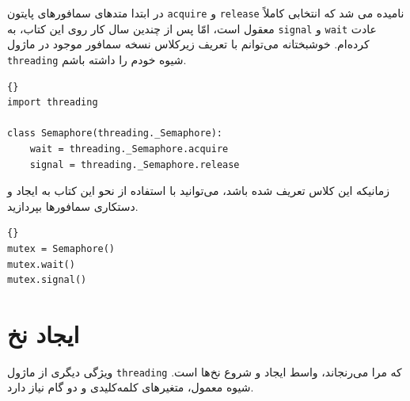 \documentclass{book}
\begin{document}
    در ابتدا متدهای سمافورهای پایتون {\tt acquire} و {\tt release} نامیده می شد که انتخابی کاملاً معقول است، امّا پس 
    از چندین سال کار روی این کتاب، به {\tt signal} و {\tt wait} عادت کرده‌ام. خوشبختانه می‌توانم با تعریف زیرکلاس 
    نسخه سمافور موجود در ماژول {\tt threading} شیوه خودم را  داشته باشم. 

\begin{latin}
\begin{lstlisting}[title=\rl{تغییر نام سمافور}]{}
import threading
 
class Semaphore(threading._Semaphore):
    wait = threading._Semaphore.acquire
    signal = threading._Semaphore.release
\end{lstlisting}
\end{latin}

    زمانیکه این کلاس تعریف شده باشد، می‌توانید با استفاده از نحو این کتاب به ایجاد و دستکاری سمافورها بپردازید. 

\begin{latin}
\begin{lstlisting}[title=\rl{مثال سمافور}]{}
mutex = Semaphore()
mutex.wait()
mutex.signal()
\end{lstlisting}
\end{latin}

\section{ایجاد نخ‌}

    ویژگی دیگری از  ماژول {\tt threading} که مرا می‌رنجاند، واسط ایجاد و شروع نخ‌ها است. 
    شیوه معمول، متغیرهای کلمه‌کلیدی و دو گام نیاز دارد. 
\end{document}
